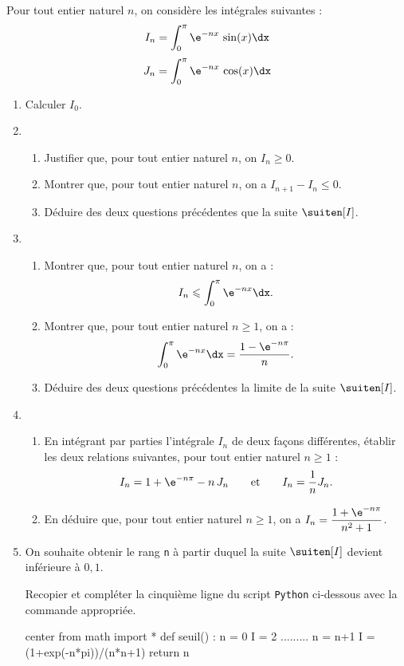 Pour tout entier naturel $n$, on considère les intégrales suivantes : \[ I_n = \int_0^{\pi} \e^{-nx}\,\sin(x) \dx \] \[J_n = \int_0^{\pi} \e^{-nx}\,\cos(x) \dx \]

\begin{enumerate}
	\item Calculer $I_0$.
	\item 
	\begin{enumerate}
		\item Justifier que, pour tout entier naturel $n$, on $I_n \geqslant 0$.
		\item Montrer que, pour tout entier naturel $n$, on a $I_{n+1}-I_n \leqslant 0$.
		\item Déduire des deux questions précédentes que la suite $\suiten[I]$.
	\end{enumerate}
	\item 
	\begin{enumerate}
		\item Montrer que, pour tout entier naturel $n$, on a : \[ I_n \leqslant \int_0^{\pi} \e^{-nx} \dx. \]
		\item Montrer que, pour tout entier naturel $n \geqslant 1$, on a : \[ \int_0^{\pi} \e^{-nx} \dx = \frac{1-\e^{-n\pi}}{n}. \]
		\item Déduire des deux questions précédentes la limite de la suite $\suiten[I]$.
	\end{enumerate}
	\item 
	\begin{enumerate}
		\item En intégrant par parties l'intégrale $I_n$ de deux façons différentes, établir les deux relations suivantes, pour tout entier naturel $n \geqslant 1$ : \[ I_n = 1+\e^{-n\pi} - n\,J_n \qquad \text{et} \qquad I_n = \frac{1}{n} J_n. \]
		\item En déduire que, pour tout entier naturel $n \geqslant 1$, on a $I_n = \dfrac{1+\e^{-n\pi}}{n^2+1}$.
	\end{enumerate}
	\item On souhaite obtenir le rang \texttt{n} à partir duquel la suite $\suiten[I]$ devient inférieure à $0,1$.
	
	Recopier et compléter la cinquième ligne du script \texttt{Python} ci-dessous avec la commande appropriée.
	
\begin{CodePythonLstAlt}[Largeur=0.75\linewidth]{center}
from math import *
def seuil() :
	n = 0
	I = 2
	.........
		n = n+1
		I = (1+exp(-n*pi))/(n*n+1)
	return n
\end{CodePythonLstAlt}
\end{enumerate}